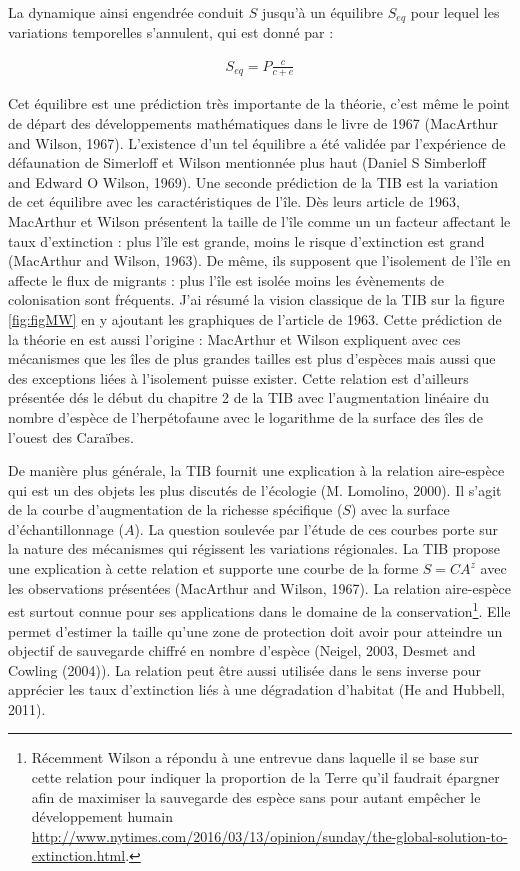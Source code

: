 La dynamique ainsi engendrée conduit \(S\) jusqu'à un équilibre
\(S_{eq}\) pour lequel les variations temporelles s'annulent, qui est
donné par :

\begin{eqnarray}
S_{eq} = P \frac{c}{c+e}
\end{eqnarray}

Cet équilibre est une prédiction très importante de la théorie, c'est
même le point de départ des développements mathématiques dans le livre
de 1967 (MacArthur and Wilson, 1967). L'existence d'un tel équilibre a
été validée par l'expérience de défaunation de Simerloff et Wilson
mentionnée plus haut (Daniel S Simberloff and Edward O Wilson, 1969).
Une seconde prédiction de la TIB est la variation de cet équilibre avec
les caractéristiques de l'île. Dès leurs article de 1963, MacArthur et
Wilson présentent la taille de l'île comme un un facteur affectant le
taux d'extinction : plus l'île est grande, moins le risque d'extinction
est grand (MacArthur and Wilson, 1963). De même, ils supposent que
l'isolement de l'île en affecte le flux de migrants : plus l'île est
isolée moins les évènements de colonisation sont fréquents. J'ai résumé
la vision classique de la TIB sur la figure \ref{fig:figMW} en y
ajoutant les graphiques de l'article de 1963. Cette prédiction de la
théorie en est aussi l'origine : MacArthur et Wilson expliquent avec ces
mécanismes que les îles de plus grandes tailles est plus d'espèces mais
aussi que des exceptions liées à l'isolement puisse exister. Cette
relation est d'ailleurs présentée dés le début du chapitre 2 de la TIB
avec l'augmentation linéaire du nombre d'espèce de l'herpétofaune avec
le logarithme de la surface des îles de l'ouest des Caraïbes.

De manière plus générale, la TIB fournit une explication à la relation
aire-espèce qui est un des objets les plus discutés de l'écologie (M.
Lomolino, 2000). Il s'agit de la courbe d'augmentation de la richesse
spécifique (\(S\)) avec la surface d'échantillonnage (\(A\)). La
question soulevée par l'étude de ces courbes porte sur la nature des
mécanismes qui régissent les variations régionales. La TIB propose une
explication à cette relation et supporte une courbe de la forme
\(S=CA^z\) avec les observations présentées (MacArthur and Wilson,
1967). La relation aire-espèce est surtout connue pour ses applications
dans le domaine de la conservation\footnote{Récemment Wilson a répondu à
  une entrevue dans laquelle il se base sur cette relation pour indiquer
  la proportion de la Terre qu'il faudrait épargner afin de maximiser la
  sauvegarde des espèce sans pour autant empêcher le développement
  humain
  \url{http://www.nytimes.com/2016/03/13/opinion/sunday/the-global-solution-to-extinction.html}.}.
Elle permet d'estimer la taille qu'une zone de protection doit avoir
pour atteindre un objectif de sauvegarde chiffré en nombre d'espèce
(Neigel, 2003, Desmet and Cowling (2004)). La relation peut être aussi
utilisée dans le sens inverse pour apprécier les taux d'extinction liés
à une dégradation d'habitat (He and Hubbell, 2011).


